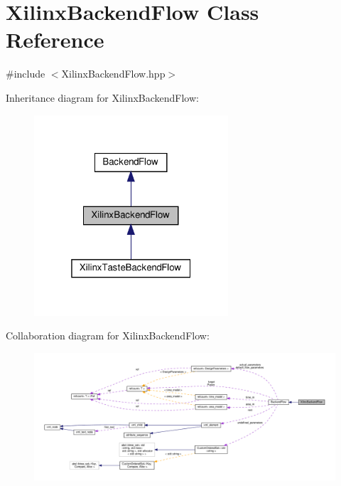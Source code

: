 \hypertarget{classXilinxBackendFlow}{}\section{Xilinx\+Backend\+Flow Class Reference}
\label{classXilinxBackendFlow}


{\ttfamily \#include $<$Xilinx\+Backend\+Flow.\+hpp$>$}



Inheritance diagram for Xilinx\+Backend\+Flow\+:
\nopagebreak
\begin{figure}[H]
\begin{center}
\leavevmode
\includegraphics[width=205pt]{dc/dad/classXilinxBackendFlow__inherit__graph}
\end{center}
\end{figure}


Collaboration diagram for Xilinx\+Backend\+Flow\+:
\nopagebreak
\begin{figure}[H]
\begin{center}
\leavevmode
\includegraphics[width=350pt]{d4/de9/classXilinxBackendFlow__coll__graph}
\end{center}
\end{figure}

